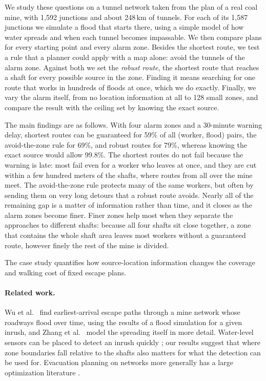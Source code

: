 \documentclass[11pt,a4paper]{article}
\begin{document}
We study these questions on a tunnel network taken from the plan of a real coal mine, with 1,592 junctions and about 248\,km of tunnels. For each of its 1,587 junctions we simulate a flood that starts there, using a simple model of how water spreads and when each tunnel becomes impassable. We then compare plans for every starting point and every alarm zone. Besides the shortest route, we test a rule that a planner could apply with a map alone: avoid the tunnels of the alarm zone. Against both we set the \emph{robust route}, the shortest route that reaches a shaft for every possible source in the zone. Finding it means searching for one route that works in hundreds of floods at once, which we do exactly. Finally, we vary the alarm itself, from no location information at all to 128 small zones, and compare the result with the ceiling set by knowing the exact source.

The main findings are as follows. With four alarm zones and a 30-minute warning delay, shortest routes can be guaranteed for 59\% of all (worker, flood) pairs, the avoid-the-zone rule for 69\%, and robust routes for 79\%, whereas knowing the exact source would allow 99.8\%. The shortest routes do not fail because the warning is late: most fail even for a worker who leaves at once, and they are cut within a few hundred meters of the shafts, where routes from all over the mine meet. The avoid-the-zone rule protects many of the same workers, but often by sending them on very long detours that a robust route avoids. Nearly all of the remaining gap is a matter of information rather than time, and it closes as the alarm zones become finer. Finer zones help most when they separate the approaches to different shafts: because all four shafts sit close together, a zone that contains the whole shaft area leaves most workers without a guaranteed route, however finely the rest of the mine is divided.

The case study quantifies how source-location information changes the coverage and walking cost of fixed escape plans.

\paragraph{Related work.}
Wu et al.\ \cite{wu2020} find earliest-arrival escape paths through a mine network whose roadways flood over time, using the results of a flood simulation for a given inrush, and Zhang et al.\ \cite{zhang2022} model the spreading itself in more detail. Water-level sensors can be placed to detect an inrush quickly \cite{wu2021}; our results suggest that where zone boundaries fall relative to the shafts also matters for what the detection can be used for. Evacuation planning on networks more generally has a large optimization literature \cite{bayram2016}.
\end{document}
